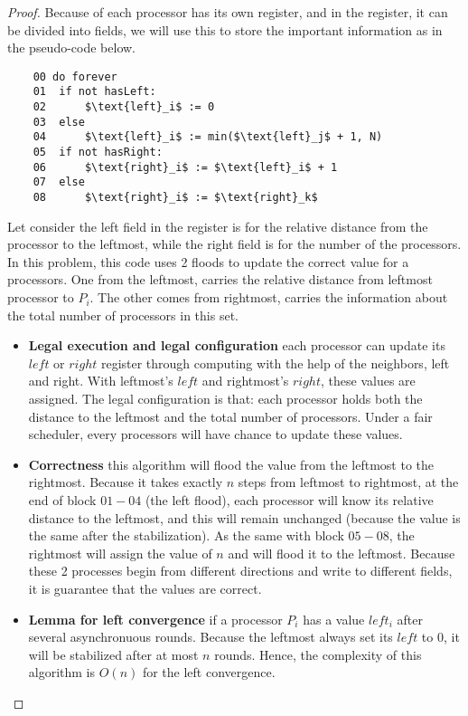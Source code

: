 \documentclass[12pt]{article}
\begin{document}
\begin{proof}

Because of each processor has its own register, and in the register, it can be divided into fields,
we will use this to store the important information as in the pseudo-code below.

\begin{lstlisting}
    00 do forever
    01  if not hasLeft:
    02      $\text{left}_i$ := 0
    03  else
    04      $\text{left}_i$ := min($\text{left}_j$ + 1, N)
    05  if not hasRight:
    06      $\text{right}_i$ := $\text{left}_i$ + 1
    07  else
    08      $\text{right}_i$ := $\text{right}_k$
\end{lstlisting}

Let consider the left field in the register is for the relative distance from the processor to the leftmost,
while the right field is for the number of the processors. In this problem, this code uses 2 floods to update the correct value for a processors. One from the leftmost, 
carries the relative distance from leftmost processor to $P_i$. The other comes from rightmost, carries the 
information about the total number of processors in this set.

\begin{itemize}
    \item \textbf{Legal execution and legal configuration} each processor can update its $left$ or $right$ register through computing with
    the help of the neighbors, left and right. With leftmost's $left$ and rightmost's $right$, these values are
    assigned. The legal configuration is that: each processor holds both the distance to the leftmost and the total number
    of processors. Under a fair scheduler, every processors will have chance to update these values.

    \item \textbf{Correctness} this algorithm will flood the value from the leftmost to the rightmost. Because
    it takes exactly $n$ steps from leftmost to rightmost, at the end of block $01 - 04$ (the left flood), each 
    processor will know its relative distance to the leftmost, and this will remain unchanged (because the value is 
    the same after the stabilization). As the same with block $05-08$, the rightmost will assign the value of $n$
    and will flood it to the leftmost. Because these 2 processes begin from different directions and write to different
    fields, it is guarantee that the values are correct.

    \item \textbf{Lemma for left convergence} if a processor $P_i$ has a value $left_i$ after several asynchronuous rounds.
    Because the leftmost always set its $left$ to 0, it will be stabilized after at most $n$ rounds. Hence, the complexity of 
    this algorithm is $O(n)$ for the left convergence.
    

\end{itemize}
\end{proof}
\end{document}
